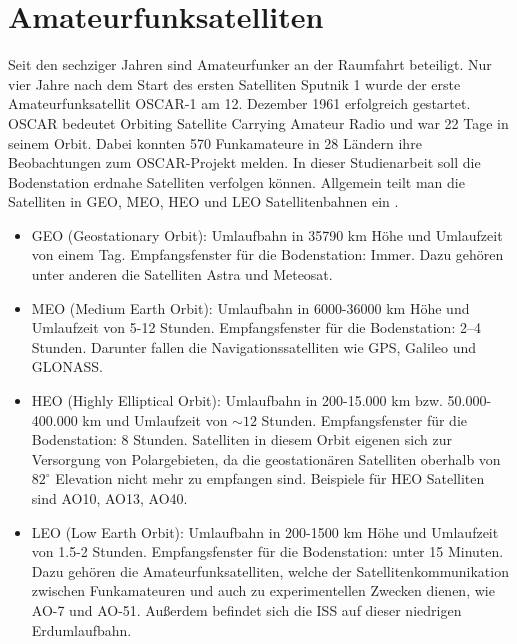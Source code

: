 
\chapter{Amateurfunksatelliten}
Seit den sechziger Jahren sind Amateurfunker an der Raumfahrt beteiligt. Nur vier Jahre nach dem 
Start des ersten Satelliten Sputnik 1 wurde der erste Amateurfunksatellit OSCAR-1 am 12. Dezember 
1961 erfolgreich gestartet. OSCAR bedeutet Orbiting Satellite Carrying Amateur Radio und war 22 
Tage in seinem Orbit. Dabei konnten 570 Funkamateure in 28 Ländern ihre Beobachtungen zum 
OSCAR-Projekt melden.
In dieser Studienarbeit soll die Bodenstation erdnahe Satelliten verfolgen können. 
Allgemein teilt man die Satelliten in GEO, MEO, HEO und LEO Satellitenbahnen ein \cite{orbit}.
\begin{itemize}
  \item GEO (Geostationary Orbit): Umlaufbahn in 35790 km Höhe und Umlaufzeit von einem Tag. Empfangsfenster für die Bodenstation: Immer. Dazu 
gehören unter anderen die Satelliten Astra und Meteosat.
  \item MEO (Medium Earth Orbit): Umlaufbahn in 6000-36000 km Höhe und Umlaufzeit von 5-12 Stunden. Empfangsfenster für die Bodenstation: 2–4 
Stunden. Darunter fallen die Navigationssatelliten wie GPS, Galileo und GLONASS.
  \item HEO (Highly Elliptical Orbit): Umlaufbahn in 200-15.000 km bzw. 50.000-400.000 km und Umlaufzeit von $\sim 12$ Stunden. Empfangsfenster für 
die Bodenstation: 8 Stunden. Satelliten in diesem Orbit eigenen sich zur Versorgung von Polargebieten, da die geostationären Satelliten oberhalb von 
$82^\circ$ Elevation nicht mehr zu empfangen sind. Beispiele für HEO Satelliten sind AO10, AO13, AO40.
  \item LEO (Low Earth Orbit): Umlaufbahn in 200-1500 km Höhe und Umlaufzeit von 1.5-2 Stunden. Empfangsfenster für die Bodenstation: unter 15 
Minuten. Dazu gehören die Amateurfunksatelliten, welche der Satellitenkommunikation zwischen Funkamateuren und auch zu experimentellen Zwecken 
dienen, wie AO-7 und AO-51. Außerdem befindet sich die ISS auf dieser niedrigen Erdumlaufbahn.
\end{itemize}
